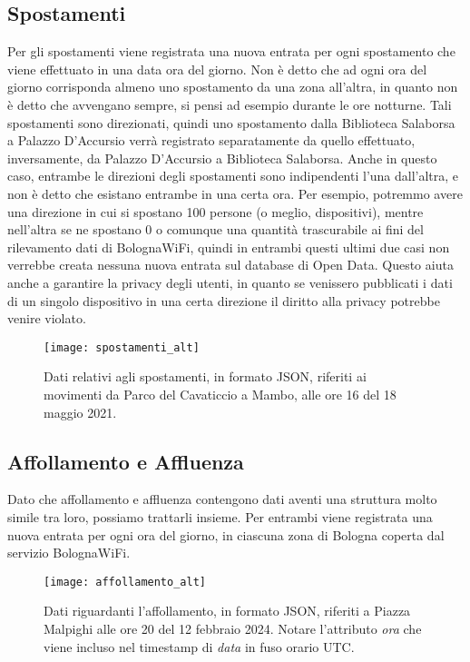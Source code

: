 \subsection{Spostamenti}
Per gli spostamenti viene registrata una nuova entrata per ogni spostamento che viene effettuato in una data ora del giorno. Non è detto che ad ogni ora del giorno corrisponda almeno uno spostamento da una zona all'altra, in quanto non è detto che avvengano sempre, si pensi ad esempio durante le ore notturne. Tali spostamenti sono direzionati, quindi uno spostamento dalla Biblioteca Salaborsa a Palazzo D'Accursio verrà registrato separatamente da quello effettuato, inversamente, da Palazzo D'Accursio a Biblioteca Salaborsa. Anche in questo caso, entrambe le direzioni degli spostamenti sono indipendenti l'una dall'altra, e non è detto che esistano entrambe in una certa ora. Per esempio, potremmo avere una direzione in cui si spostano 100 persone (o meglio, dispositivi), mentre nell'altra se ne spostano 0 o comunque una quantità trascurabile ai fini del rilevamento dati di BolognaWiFi, quindi in entrambi questi ultimi due casi non verrebbe creata nessuna nuova entrata sul database di Open Data. Questo aiuta anche a garantire la privacy degli utenti, in quanto se venissero pubblicati i dati di un singolo dispositivo in una certa direzione il diritto alla privacy potrebbe venire violato.

\begin{figure}[h]
    \centering
    \texttt{[image: spostamenti\_alt]}
    \caption[Struttura dei dati sugli spostamenti]{Dati relativi agli spostamenti, in formato JSON, riferiti ai movimenti da Parco del Cavaticcio a Mambo, alle ore 16 del 18 maggio 2021.}
\end{figure}

\subsection{Affollamento e Affluenza}
Dato che affollamento e affluenza contengono dati aventi una struttura molto simile tra loro, possiamo trattarli insieme. Per entrambi viene registrata una nuova entrata per ogni ora del giorno, in ciascuna zona di Bologna coperta dal servizio BolognaWiFi.

\begin{figure}[H]
    \centering
    \texttt{[image: affollamento\_alt]}
    \caption[Struttura dei dati sull'affollamento]{Dati riguardanti l'affollamento, in formato JSON, riferiti a Piazza Malpighi alle ore 20 del 12 febbraio 2024. Notare l'attributo \textit{ora} che viene incluso nel timestamp di \textit{data} in fuso orario UTC.}
\end{figure}

